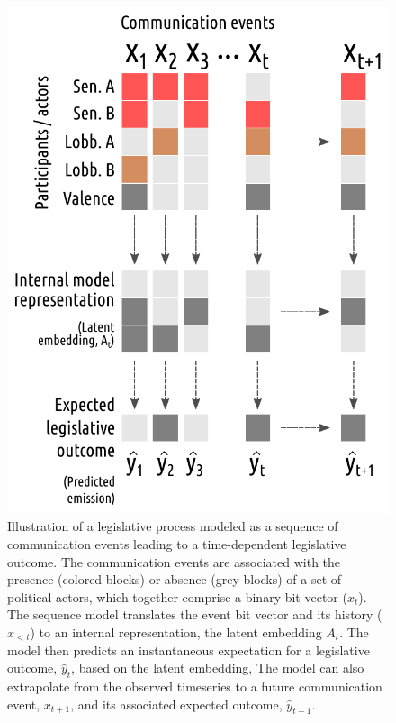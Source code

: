 \documentclass[nonacm,12pt]{acmart}
\begin{document}
\begin{figure}[h]
  \centering
  \includegraphics[width=0.7\linewidth]{sequence_generation.pdf}
  \caption{
  \label{fig:seq}
      Illustration of a legislative process modeled as a sequence of communication events leading to a time-dependent legislative outcome.  
      The communication events are associated with the presence (colored blocks) or absence (grey blocks) of a set of political actors, which together comprise a binary bit vector ($x_t$).
      The sequence model translates the event bit vector and its history ($x_{<t}$) to an internal representation, the latent embedding $A_t$.
      The model then predicts an instantaneous expectation for a legislative outcome, $\hat{y}_t$, based on the latent embedding,
      The model can also extrapolate from the observed timeseries to a future communication event, $x_{t+1}$, and its associated expected outcome, $\hat{y}_{t+1}$.
  }
\end{figure}
\end{document}
